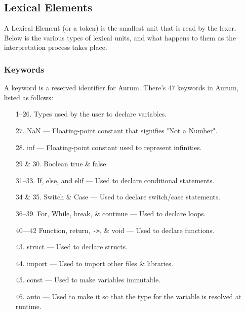 \documentclass[12pt, letterpaper, oneside]{article}
\begin{document}
	\subsection{Lexical Elements}
	A Lexical Element (or a token) is the smallest unit that is read by the lexer. Below is the various types of lexical units, and what happens to them as the interpretation process takes place.
	\subsubsection{Keywords}
	A keyword is a reserved identifier for Aurum. There's 47 keywords in Aurum, listed as follows:
	\begin{enumerate}
		\item[1--26.] Types used by the user to declare variables.
		\item[27.] NaN --- Floating-point constant that signifies "Not a Number".
		\item[28.] inf --- Floating-point constant used to represent infinities.
		\item[29 \& 30.] Boolean true \& false
		\item[31--33.] If, else, and elif --- Used to declare conditional statements.
		\item[34 \& 35.] Switch \& Case --- Used to declare switch/case statements.
		\item[36--39.] For, While, break, \& continue --- Used to declare loops.
		\item[40---42] Function, return, \verb|->|, \& void --- Used to declare functions.
		\item[43.] struct --- Used to declare structs.
		\item[44.] import --- Used to import other files \& libraries.
		\item[45.] const --- Used to make variables immutable.
		\item[46.] auto --- Used to make it so that the type for the variable is resolved at runtime.
	\end{enumerate}
	
\end{document}
